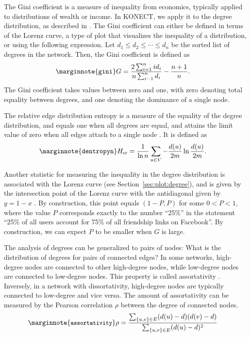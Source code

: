 \documentclass{article}
\begin{document}
The Gini coefficient is a measure of inequality from economics,
typically applied to distributions of wealth or income.  In KONECT, we
apply it to the degree distribution, as described in
\citep{kunegis:power-law}.  The Gini coefficient can either be defined in
terms of the Lorenz curve, a type of plot that visualizes the inequality
of a distribution, or using the following expression.  Let $d_1 \leq d_2
\leq \dotsb \leq d_{n}$ be the sorted list of degrees in the
network. Then, the Gini coefficient is defined as
\begin{align}
  \marginnote{\texttt{gini}} G &= \frac {2 \sum_{i=1}^{n} i d_i} {n
    \sum_{i-1}^{n} d_i} - \frac {n+1} {n}.
\end{align}
The Gini coefficient takes values between zero and one, with zero
denoting total equality between degrees, and one denoting the dominance
of a single node.

The relative edge distribution entropy is a measure of the equality of
the degree distribution, and equals one when all degrees are equal, and
attains the limit value of zero when all edges attach to a single node
\citep{kunegis:power-law}.  It is defined as
\begin{align}
  \marginnote{\texttt{dentropyn}} H_{\mathrm{er}} &= \frac 1 {\ln n}
  \sum_{u \in V} - \frac{d(u)}{2m} \ln \frac{d(u)}{2m}.
\end{align}

Another statistic for  measuring the inequality
in the degree distribution is associated with the Lorenz curve (see
Section~\ref{sec:plot:degree}), and is given by the intersection point
of the Lorenz curve with the antidiagonal given by $y = 1 - x$
\citep{kunegis:power-law}.  By construction, this point equals $(1-P, P)$
for some $0<P<1$, where the value $P$ corresponds exactly to the number
``25\%'' in the statement ``25\% of all users account for 75\% of all
friendship links on Facebook''.  By construction, we can expect $P$ to
be smaller when $G$ is large.

The analysis of degrees can be generalized to pairs of nodes:  What is
the distribution of degrees for pairs of connected edges?  In some
networks, high-degree nodes are connected to other high-degree nodes,
while low-degree nodes are connected to low-degree nodes.  This property
is called assortativity \citep{b854}.  Inversely, in a network with dissortativity,
high-degree nodes are typically connected to low-degree and vice versa.
The amount of assortativity can be measured by the Pearson correlation
$\rho$ between the degree of connected nodes.  
\begin{align}
  \marginnote{\texttt{\small assortativity}} \rho &= \frac
  {\sum_{\{u,v\} \in E} (d(u) - d)(d(v) - d)}
  {\sum_{\{u,v\} \in E} (d(u) - d)^2}
\end{align}
\end{document}
